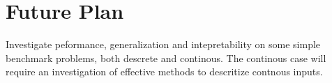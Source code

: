 \chapter{Future Plan}\label{C:futureplan}
Investigate peformance, generalization and intepretability on some simple benchmark problems, both descrete and continous. The continous case will require an investigation of effective methods to descritize contnous inputs.